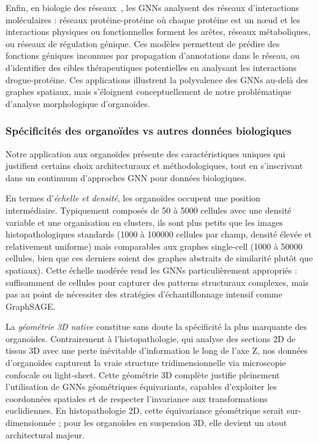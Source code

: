 Enfin, en biologie des réseaux~\cite{Zhang2021GNN}, les GNNs analysent des réseaux d'interactions moléculaires : réseaux protéine-protéine où chaque protéine est un nœud et les interactions physiques ou fonctionnelles forment les arêtes, réseaux métaboliques, ou réseaux de régulation génique. Ces modèles permettent de prédire des fonctions géniques inconnues par propagation d'annotations dans le réseau, ou d'identifier des cibles thérapeutiques potentielles en analysant les interactions drogue-protéine. Ces applications illustrent la polyvalence des GNNs au-delà des graphes spatiaux, mais s'éloignent conceptuellement de notre problématique d'analyse morphologique d'organoïdes.

\subsubsection{Spécificités des organoïdes vs autres données biologiques}

Notre application aux organoïdes présente des caractéristiques uniques qui justifient certains choix architecturaux et méthodologiques, tout en s'inscrivant dans un continuum d'approches GNN pour données biologiques.

En termes d'\textit{échelle et densité}, les organoïdes occupent une position intermédiaire. Typiquement composés de 50 à 5000 cellules avec une densité variable et une organisation en clusters, ils sont plus petits que les images histopathologiques standards (1000 à 100000 cellules par champ, densité élevée et relativement uniforme) mais comparables aux graphes single-cell (1000 à 50000 cellules, bien que ces derniers soient des graphes abstraits de similarité plutôt que spatiaux). Cette échelle modérée rend les GNNs particulièrement appropriés : suffisamment de cellules pour capturer des patterns structuraux complexes, mais pas au point de nécessiter des stratégies d'échantillonnage intensif comme GraphSAGE.

La \textit{géométrie 3D native} constitue sans doute la spécificité la plus marquante des organoïdes. Contrairement à l'histopathologie, qui analyse des sections 2D de tissus 3D avec une perte inévitable d'information le long de l'axe Z, nos données d'organoïdes capturent la vraie structure tridimensionnelle via microscopie confocale ou light-sheet. Cette géométrie 3D complète justifie pleinement l'utilisation de GNNs géométriques équivariants, capables d'exploiter les coordonnées spatiales et de respecter l'invariance aux transformations euclidiennes. En histopathologie 2D, cette équivariance géométrique serait sur-dimensionnée ; pour les organoïdes en suspension 3D, elle devient un atout architectural majeur.

